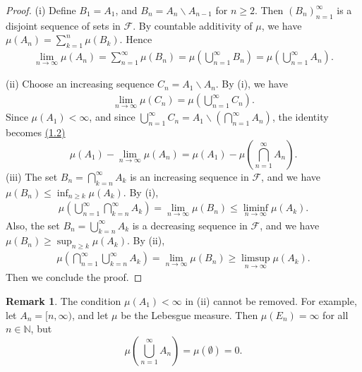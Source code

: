 \documentclass{article}
\numberwithin{equation}{section}
\newcommand{\scr}{\mathscr}
\theoremstyle{plain}
\theoremstyle{definition}
\newtheorem*{remark}{Remark}
\begin{document}
\begin{proof}
(i) Define $B_1=A_1$, and $B_n=A_n\backslash A_{n-1}$ for $n\geq 2$. Then $(B_n)_{n=1}^\infty$ is a disjoint sequence of sets in $\mathscr{F}$. By countable additivity of $\mu$, we have $\mu(A_n) = \sum_{k=1}^n\mu(B_k)$. Hence
\begin{align*}
	\lim_{n\to\infty}\mu(A_n) = \sum_{n=1}^\infty\mu(B_n) = \mu\left(\bigcup_{n=1}^\infty B_n\right) = \mu\left(\bigcup_{n=1}^\infty A_n\right).
\end{align*}
\item (ii) Choose an increasing sequence $C_n=A_1\backslash A_n$. By (i), we have
\begin{align*}
	\lim_{n\to\infty}\mu(C_n) = \mu\left(\bigcup_{n=1}^\infty C_n\right).\label{eq:1.2}\tag{1.2}
\end{align*}
Since $\mu(A_1)<\infty$, and since $\bigcup_{n=1}^\infty C_n = A_1\backslash\left(\bigcap_{n=1}^\infty A_n\right)$, the identity becomes \hyperref[eq:1.2]{(1.2)} $$\mu(A_1)-\lim_{n\to\infty}\mu(A_n)=\mu(A_1) - \mu\left(\bigcap_{n=1}^\infty A_n\right).$$
(iii) The set $B_n=\bigcap_{k=n}^\infty A_k$ is an increasing sequence in $\scr{F}$, and we have $\mu(B_n)\leq\inf_{n\geq k}\mu(A_k)$. By (i),
\begin{align*}
	\mu\left(\bigcup_{n=1}^\infty\bigcap_{k=n}^\infty A_k\right)=\lim_{n\to\infty}\mu(B_n)\leq\liminf_{n\to\infty}\mu(A_k).
\end{align*}
Also, the set $B_n=\bigcup_{k=n}^\infty A_k$ is a decreasing sequence in $\scr{F}$, and we have $\mu(B_n)\geq\sup_{n\geq k}\mu(A_k)$. By (ii),
\begin{align*}
	\mu\left(\bigcap_{n=1}^\infty\bigcup_{k=n}^\infty A_k\right)=\lim_{n\to\infty}\mu(B_n)\geq\limsup_{n\to\infty}\mu(A_k).
\end{align*}
Then we conclude the proof.
\end{proof}
\begin{remark}
The condition $\mu(A_1)<\infty$ in (ii) cannot be removed. For example, let $A_n=[n,\infty)$, and let $\mu$ be the Lebesgue measure. Then $\mu(E_n)=\infty$ for all $n\in\mathbb{N}$, but $$\mu\left(\bigcup_{n=1}^\infty A_n\right)=\mu(\emptyset)=0.$$
\end{remark}
\end{document}
